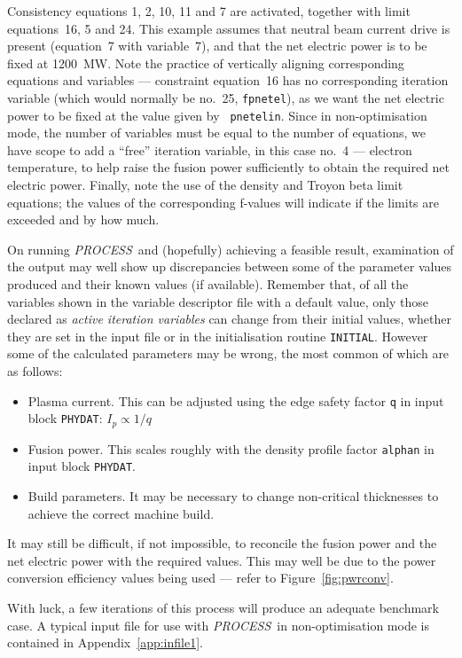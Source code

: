 \documentclass[11pt,a4paper]{report}
\newcommand{\PS}{\mbox{\it PROCESS\/ }}
\begin{document}
Consistency equations 1, 2, 10, 11 and 7 are activated, together with limit
equations~16, 5 and 24. This example assumes that neutral beam current drive
is present (equation~7 with variable~7), and that the net electric power is to
be fixed at 1200~MW\@. Note the practice of vertically aligning corresponding
equations and variables --- constraint equation~16 has no corresponding
iteration variable (which would normally be no.\ 25, {\tt fpnetel}), as we
want the net electric power to be fixed at the value given by {\tt
pnetelin}. Since in non-optimisation mode, the number of variables must be
equal to the number of equations, we have scope to add a ``free'' iteration
variable, in this case no.\ 4 --- electron temperature, to help raise the
fusion power sufficiently to obtain the required net electric power. Finally,
note the use of the density and Troyon beta limit equations; the values of the
corresponding f-values will indicate if the limits are exceeded and by how
much.

On running \PS and (hopefully) achieving a feasible result, examination of the
output may well show up discrepancies between some of the parameter values
produced and their known values (if available). Remember that, of all the
variables shown in the variable descriptor file with a default value, only
those declared as {\em active iteration variables}\/ can change from their
initial values, whether they are set in the input file or in the
initialisation routine {\tt INITIAL}. However some of the calculated
parameters may be wrong, the most common of which are as follows:
\begin{itemize}
\item
Plasma current. This can be adjusted using the edge safety factor {\tt q} in
input block {\tt PHYDAT}: $I_p \propto 1/q$
\item
Fusion power. This scales roughly with the density profile factor {\tt alphan}
in input block {\tt PHYDAT}.
\item
Build parameters. It may be necessary to change non-critical thicknesses to
achieve the correct machine build.
\end{itemize}
It may still be difficult, if not impossible, to reconcile the fusion power
and the net electric power with the required values. This may well be due to
the power conversion efficiency values being used --- refer to
Figure~\ref{fig:pwrconv}.

With luck, a few iterations of this process will produce an adequate benchmark
case. A typical input file for use with \PS in non-optimisation mode is
contained in Appendix~\ref{app:infile1}.
\end{document}
